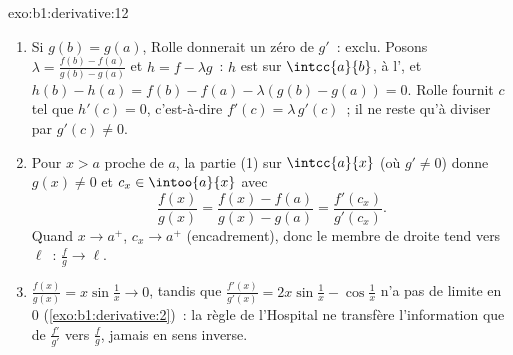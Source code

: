 \begin{solution}{exo:b1:derivative:12}
\begin{enumerate}
  \item Si $g(b) = g(a)$, Rolle donnerait un zéro  de
        $g'$~: exclu. Posons $\lambda = \frac{f(b) - f(a)}{g(b) -
        g(a)}$ et $h = f - \lambda g$~: $h$ est  sur
        $\intcc{a}{b}$,  à l', et $h(b) - h(a)
        = f(b) - f(a) - \lambda(g(b) - g(a)) = 0$. Rolle
        fournit $c$ tel que $h'(c) = 0$, c'est-à-dire $f'(c) =
        \lambda\,g'(c)$~; il ne reste qu'à diviser par $g'(c) \neq 0$.
  \item Pour $x > a$ proche de $a$, la partie (1) sur $\intcc{a}{x}$
        (où $g' \neq 0$) donne $g(x) \neq 0$ et $c_x \in
        \intoo{a}{x}$ avec
        \[
        \frac{f(x)}{g(x)} = \frac{f(x) - f(a)}{g(x) - g(a)}
        = \frac{f'(c_x)}{g'(c_x)} .
        \]
        Quand $x \to a^+$, $c_x \to a^+$ (encadrement), donc le membre
        de droite tend vers $\ell$~: $\frac{f}{g} \to \ell$.
  \item $\frac{f(x)}{g(x)} = x\sin\frac1x \to 0$, tandis que
        $\frac{f'(x)}{g'(x)} = 2x\sin\frac1x - \cos\frac1x$ n'a
        pas de limite en $0$ (\cref{exo:b1:derivative:2})~: la
        règle de l'Hospital ne transfère l'information que de
        $\frac{f'}{g'}$ vers $\frac fg$, jamais en sens inverse.
\end{enumerate}
\end{solution}

